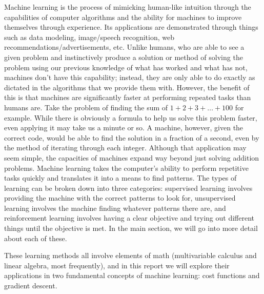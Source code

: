 \documentclass[11pt]{article}
\begin{document}
Machine learning is the process of mimicking human-like intuition through the capabilities of computer algorithms and the ability for machines to improve themselves through experience. Its applications are demonstrated through things such as data modeling, image/speech recognition, web recommendations/advertisements, etc. Unlike humans, who are able to see a given problem and instinctively produce a solution or method of solving the problem using our previous knowledge of what has worked and what has not, machines don’t have this capability; instead, they are only able to do exactly as dictated in the algorithms that we provide them with. However, the benefit of this is that machines are significantly faster at performing repeated tasks than humans are. Take the problem of finding the sum of $1+2+3+\dots+100$ for example. While there is obviously a formula to help us solve this problem faster, even applying it may take us a minute or so. A machine, however, given the correct code, would be able to find the solution in a fraction of a second, even by the method of iterating through each integer. Although that application may seem simple, the capacities of machines expand way beyond just solving addition problems. Machine learning takes the computer’s ability to perform repetitive tasks quickly and translates it into a means to find patterns. The types of learning can be broken down into three categories: supervised learning involves providing the machine with the correct patterns to look for, unsupervised learning involves the machine finding whatever patterns there are, and reinforcement learning involves having a clear objective and trying out different things until the objective is met. In the main section, we will go into more detail about each of these.

These learning methods all involve elements of math (multivariable calculus and linear algebra, most frequently), and in this report we will explore their applications in two fundamental concepts of machine learning: cost functions and gradient descent.
\end{document}
